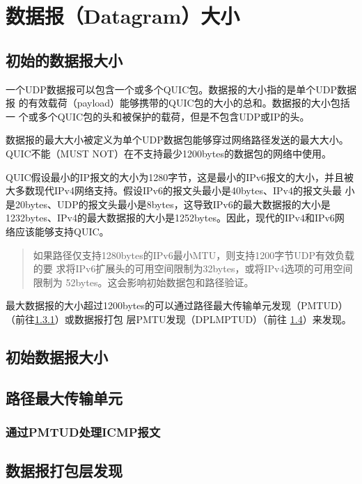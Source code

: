 \section{数据报（Datagram）大小}
\subsection{初始的数据报大小}
\label{subsec:initial-datagram-size}
一个UDP数据报可以包含一个或多个QUIC包。数据报的大小指的是单个UDP数据报
的有效载荷（payload）能够携带的QUIC包的大小的总和。数据报的大小包括一
个或多个QUIC包的头和被保护的载荷，但是不包含UDP或IP的头。

数据报的最大大小被定义为单个UDP数据包能够穿过网络路径发送的最大大小。
QUIC不能（MUST NOT）在不支持最少1200bytes的数据包的网络中使用。

QUIC假设最小的IP报文的大小为1280字节，这是最小的IPv6报文的大小，并且被
大多数现代IPv4网络支持。假设IPv6的报文头最小是40bytes、IPv4的报文头最
小是20bytes、UDP的报文头最小是8bytes，这导致IPv6的最大数据报的大小是
1232bytes、IPv4的最大数据报的大小是1252bytes。因此，现代的IPv4和IPv6网
络应该能够支持QUIC。

\begin{quote}
  如果路径仅支持1280bytes的IPv6最小MTU，则支持1200字节UDP有效负载的要
  求将IPv6扩展头的可用空间限制为32bytes，或将IPv4选项的可用空间限制为
  52bytes。这会影响初始数据包和路径验证。
\end{quote}

最大数据报的大小超过1200bytes的可以通过路径最大传输单元发现（PMTUD）
（前往\ref{subsubsec:handling-of-icmp-messages-by-pmtud}）或数据报打包
层PMTU发现（DPLMPTUD）（前往
\ref{subsec:datagram-packetization-layer-pmtu-discovery}）来发现。

\subsection{初始数据报大小}
\subsection{路径最大传输单元}
\subsubsection{通过PMTUD处理ICMP报文}
\label{subsubsec:handling-of-icmp-messages-by-pmtud}
\subsection{数据报打包层发现}
\label{subsec:datagram-packetization-layer-pmtu-discovery}